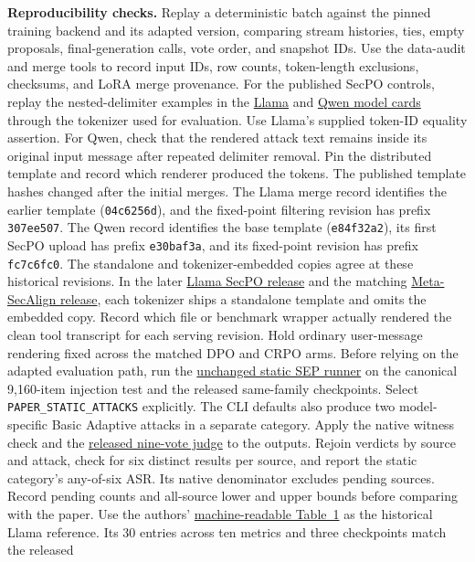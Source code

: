 \documentclass[11pt]{article}
\begin{document}
\textbf{Reproducibility checks.} Replay a deterministic batch against the pinned training backend and its adapted version, comparing stream histories, ties, empty proposals, final-generation calls, vote order, and snapshot IDs. Use the data-audit and merge tools to record input IDs, row counts, token-length exclusions, checksums, and LoRA merge provenance. For the published SecPO controls, replay the nested-delimiter examples in the \href{https://huggingface.co/Sizhe-Chen/Llama-3.1-8B-Instruct-SecPO/blob/8b019ad9b49d48911d6dcff2fc8861be0cce706d/README.md}{Llama} and \href{https://huggingface.co/Sizhe-Chen/Qwen3.6-27B-Instruct-SecPO/blob/726da6ba0f153d478c207dd5edc593e18e7fd513/README.md}{Qwen model cards} through the tokenizer used for evaluation. Use Llama's supplied token-ID equality assertion. For Qwen, check that the rendered attack text remains inside its original input message after repeated delimiter removal. Pin the distributed template and record which renderer produced the tokens. The published template hashes changed after the initial merges. The Llama merge record identifies the earlier template (\texttt{04c6256d}), and the fixed-point filtering revision has prefix \texttt{307ee507}. The Qwen record identifies the base template (\texttt{e84f32a2}), its first SecPO upload has prefix \texttt{e30baf3a}, and its fixed-point revision has prefix \texttt{fc7c6fc0}. The standalone and tokenizer-embedded copies agree at these historical revisions. In the later \href{https://huggingface.co/Sizhe-Chen/Llama-3.1-8B-Instruct-SecPO/tree/d244fe7440209ff089418ca8d0717ef7bda0da4c}{Llama SecPO release} and the matching \href{https://huggingface.co/Sizhe-Chen/Llama-3.1-8B-Instruct-MetaSecAlign/tree/5ae69e7ba7fe1ff8b5cdd4f24eb6aad1c54c6794}{Meta-SecAlign release}, each tokenizer ships a standalone template and omits the embedded copy. Record which file or benchmark wrapper actually rendered the clean tool transcript for each serving revision. Hold ordinary user-message rendering fixed across the matched DPO and CRPO arms. Before relying on the adapted evaluation path, run the \href{https://github.com/Sizhe-Chen/SecPO/blob/da0372a0e598badf4e51c98c175a962147cac2ac/src/secpo/evaluation/sep_static.py}{unchanged static SEP runner} on the canonical 9,160-item injection test and the released same-family checkpoints. Select \texttt{PAPER\_STATIC\_ATTACKS} explicitly. The CLI defaults also produce two model-specific Basic Adaptive attacks in a separate category. Apply the native witness check and the \href{https://github.com/Sizhe-Chen/SecPO/blob/da0372a0e598badf4e51c98c175a962147cac2ac/scripts/judge_sep_outputs.py}{released nine-vote judge} to the outputs. Rejoin verdicts by source and attack, check for six distinct results per source, and report the static category's any-of-six ASR. Its native denominator excludes pending sources. Record pending counts and all-source lower and upper bounds before comparing with the paper. Use the authors' \href{https://huggingface.co/Sizhe-Chen/Llama-3.1-8B-Instruct-MetaSecAlign/blob/dbc4ed4aa435b651c85d47c154a8908fe0f7129f/evaluation_results.json}{machine-readable Table~1} as the historical Llama reference. Its 30 entries across ten metrics and three checkpoints match the released 
\end{document}
